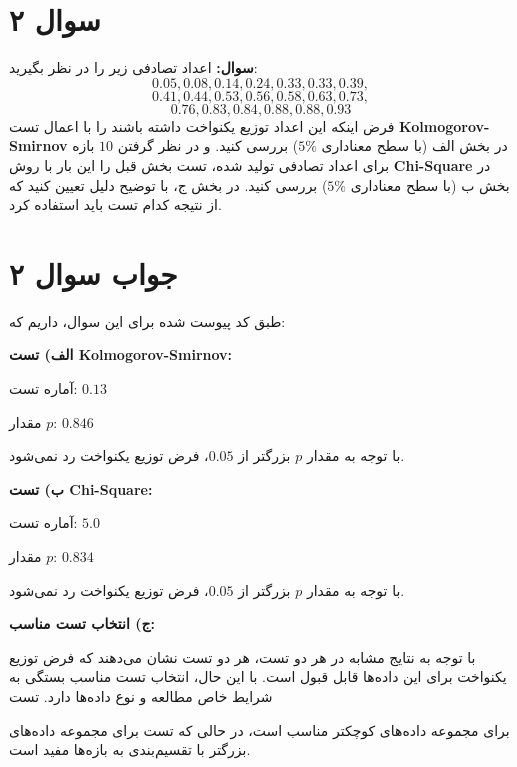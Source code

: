 \section*{سوال ۲}

\textbf{سوال:} اعداد تصادفی زیر را در نظر بگیرید:
$$
0.05, 0.08, 0.14, 0.24, 0.33, 0.33, 0.39,
$$
$$
0.41, 0.44, 0.53, 0.56, 0.58, 0.63, 0.73,
$$
$$
 0.76, 0.83, 0.84, 0.88, 0.88, 0.93
$$
فرض اینکه این اعداد توزیع یکنواخت داشته باشند را با اعمال تست \textbf{Kolmogorov-Smirnov} در بخش الف (با سطح معناداری \(5\%\)) بررسی کنید.
و در نظر گرفتن \(10\) بازه برای اعداد تصادفی تولید شده، تست بخش قبل را این بار با روش \textbf{Chi-Square} در بخش ب (با سطح معناداری \(5\%\)) بررسی کنید.
در بخش ج، با توضیح دلیل تعیین کنید که از نتیجه کدام تست باید استفاده کرد.

\section*{جواب سوال ۲}

طبق کد پیوست شده برای این سوال، داریم که:

\textbf{الف) تست Kolmogorov-Smirnov:}

آماره تست: \(0.13\)

مقدار \(p\): \(0.846\)

با توجه به مقدار \(p\) بزرگتر از \(0.05\)، فرض توزیع یکنواخت رد نمی‌شود.

\textbf{ب) تست Chi-Square:}

آماره تست: \(5.0\)

مقدار \(p\): \(0.834\)

با توجه به مقدار \(p\) بزرگتر از \(0.05\)، فرض توزیع یکنواخت رد نمی‌شود.

\textbf{ج) انتخاب تست مناسب:}

با توجه به نتایج مشابه در هر دو تست، هر دو تست نشان می‌دهند که فرض توزیع یکنواخت برای این داده‌ها قابل قبول است. با این حال، انتخاب تست مناسب بستگی به شرایط خاص مطالعه و نوع داده‌ها دارد. تست

برای مجموعه داده‌های کوچکتر مناسب است، در حالی که تست
برای مجموعه داده‌های بزرگتر با تقسیم‌بندی به بازه‌ها مفید است.